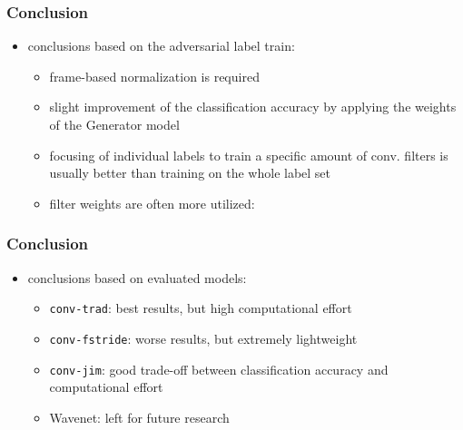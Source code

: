 \begin{frame}
  \frametitle{Conclusion}
  \begin{itemize}
  \item conclusions based on the adversarial label train:
    \begin{itemize}
      \item frame-based normalization is required
      \item slight improvement of the classification accuracy by applying the weights of the Generator model
      \item focusing of individual labels to train a specific amount of conv. filters is usually better than training on the whole label set
      \item filter weights are often more utilized:
    \end{itemize}
    \vspace{-0.25cm}
    \begin{figure}[!ht]
      \centering
    \end{figure}
  \end{itemize}
\end{frame}

\begin{frame}
  \frametitle{Conclusion}
  \begin{itemize}
  \item conclusions based on evaluated models:
    \begin{itemize}
      \item \texttt{conv-trad}: best results, but high computational effort
      \item \texttt{conv-fstride}: worse results, but extremely lightweight
      \item \texttt{conv-jim}: good trade-off between classification accuracy and computational effort
      \item Wavenet: left for future research
    \end{itemize}
  \end{itemize}
\end{frame}